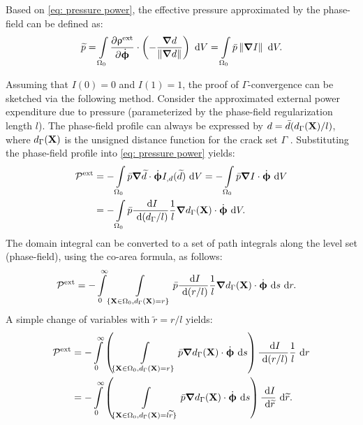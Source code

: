 \begin{remark}
  Based on \eqref{eq: pressure power}, the effective pressure approximated by the phase-field can be defined as:
  \begin{align}
    \widetilde{p} = \int\limits_{\Omega_0} \dfrac{\partial \uprho^\text{ext}}{\partial \dot{\boldsymbol{\upphi}}} \cdot \left( -\dfrac{\boldsymbol{\nabla} d}{\left\lVert\boldsymbol{\nabla} d\right\rVert} \right) \text{ d}V = \int\limits_{\Omega_0} \bar{p} \left\lVert\boldsymbol{\nabla} I\right\rVert \text{ d}V.
    \label{eq:pressure_approx}
  \end{align}
\end{remark}

Assuming that $I(0)=0$ and $I(1)=1$, the proof of $\Gamma$-convergence can be sketched via the following method. Consider the approximated external power expenditure due to pressure (parameterized by the phase-field regularization length $l$). The phase-field profile can always be expressed by $d = \bar{d}(d_\Gamma(\textbf{X})/l)$, where $d_\Gamma(\textbf{X})$ is the unsigned distance function for the crack set $\Gamma$ \cite{JYWu2017}. Substituting the phase-field profile into \eqref{eq: pressure power} yields:
\begin{equation}
  \begin{aligned}
    \mathcal{P}^\text{ext} & = - \int\limits_{\Omega_0} \bar{p} \boldsymbol{\nabla} \widetilde{d} \cdot \dot{\boldsymbol{\upphi}} I_{,d}(\widetilde{d}) \text{ d}V = - \int\limits_{\Omega_0} \bar{p} \boldsymbol{\nabla} I \cdot \dot{\boldsymbol{\upphi}} \text{ d}V \\
                           & = - \int\limits_{\Omega_0} \bar{p} \dfrac{\text{ d}I}{\text{ d}(d_\Gamma/l)} \dfrac{1}{l} \boldsymbol{\nabla} d_\Gamma(\textbf{X}) \cdot \dot{\boldsymbol{\upphi}} \text{ d}V.                                    
  \end{aligned}
\end{equation}
The domain integral can be converted to a set of path integrals along the level set (phase-field), using the co-area formula, as follows:
\begin{align}
  \mathcal{P}^\text{ext} & = - \int\limits_0^\infty \int\limits_{\{ \textbf{X}\in{\Omega_0}, d_\Gamma(\textbf{X})=r \}} \bar{p} \dfrac{\text{ d}I}{\text{ d}(r/l)} \dfrac{1}{l} \boldsymbol{\nabla} d_\Gamma(\textbf{X}) \cdot \dot{\boldsymbol{\upphi}} \text{ d}s \text{ d}r . 
\end{align}
A simple change of variables with $\widetilde{r}=r/l$ yields:
\begin{equation}
  \begin{aligned}
    \mathcal{P}^\text{ext} & = - \int\limits_0^\infty \left( \int\limits_{\{ \textbf{X}\in{\Omega_0}, d_\Gamma(\textbf{X})=r \}} \bar{p} \boldsymbol{\nabla} d_\Gamma(\textbf{X}) \cdot \dot{\boldsymbol{\upphi}} \text{ d}s \right) \dfrac{\text{ d}I}{\text{ d}(r/l)} \dfrac{1}{l} \text{ d}r                       \\
                           & = - \int\limits_0^\infty \left( \int\limits_{\{ \textbf{X}\in{\Omega_0}, d_\Gamma(\textbf{X})=l\widetilde{r} \}} \bar{p} \boldsymbol{\nabla} d_\Gamma(\textbf{X}) \cdot \dot{\boldsymbol{\upphi}} \text{ d}s \right) \dfrac{\text{ d}I}{\text{ d}\widetilde{r}} \text{ d}\widetilde{r} . 
  \end{aligned}
\end{equation}
